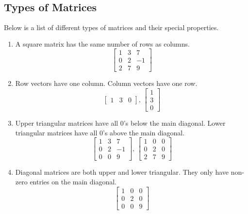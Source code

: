 \subsection{Types of Matrices}
\noindent
Below is a list of different types of matrices and their special properties.
\begin{enumerate}[label=]
	\item A square matrix has the same number of rows as columns.
		\begin{equation*}
			\begin{bmatrix}
				1 & 3 & 7 \\
				0 & 2 & -1 \\
				2 & 7 & 9
			\end{bmatrix}
		\end{equation*}
	\item Row vectors have one column. Column vectors have one row.
		\begin{equation*}
			\begin{bmatrix}
			1 & 3 & 0
			\end{bmatrix} \text{, } \begin{bmatrix}
			1 \\
			3 \\
			0
			\end{bmatrix}
		\end{equation*}
	\item Upper triangular matrices have all 0's below the main diagonal. Lower triangular matrices have all 0's above the main diagonal.
		\begin{equation*}
			\begin{bmatrix}
				1 & 3 & 7 \\
				0 & 2 & -1 \\
				0 & 0 & 9
			\end{bmatrix} \text{, } \begin{bmatrix}
				1 & 0 & 0 \\
				0 & 2 & 0 \\
				2 & 7 & 9
			\end{bmatrix}
		\end{equation*}
	\item Diagonal matrices are both upper and lower triangular. They only have non-zero entries on the main diagonal.
		\begin{equation*}
			\begin{bmatrix}
				1 & 0 & 0 \\
				0 & 2 & 0 \\
				0 & 0 & 9
			\end{bmatrix}

\end{equation*}
\end{enumerate}
